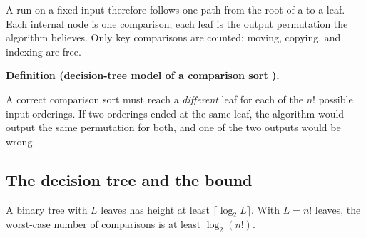 \documentclass[11pt]{article}
\newenvironment{definitionbox}[1]{%
  \par\noindent\textbf{Definition (#1).}\ \itshape
}{\par\vspace{0.3em}}
\begin{document}
A run on a fixed input therefore follows one path from the root of a  to a leaf. Each internal node is one comparison; each leaf is the output permutation the algorithm believes. Only key comparisons are counted; moving, copying, and indexing are free.

\begin{definitionbox}{decision-tree model of a comparison sort \cite{AhoHopcroftUllman1983_data_structures_algorithms}}
A correct comparison sort must reach a \emph{different} leaf for each of the $n!$ possible input orderings. If two orderings ended at the same leaf, the algorithm would output the same permutation for both, and one of the two outputs would be wrong.
\end{definitionbox}

\subsection{The decision tree and the bound}

A binary tree with $L$ leaves has height at least $\lceil\log_2 L\rceil$. With $L=n!$ leaves, the worst-case number of comparisons is at least $\log_2(n!)$.
\end{document}
